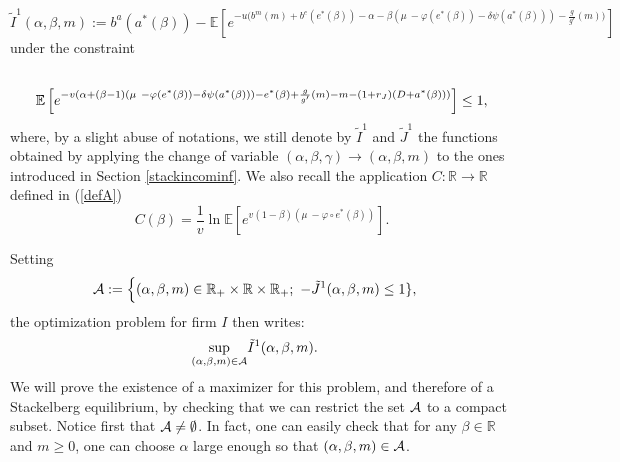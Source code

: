 \documentclass{svjour3}
\begin{document}
$$\tilde I^1(\alpha,\beta,m):=
b^a(a^*(\beta))- \mathbb{E} \left[ e^{-u  \big(b^m(m)+b^e(e^*(\beta))-\alpha-\beta(\mu~-\varphi(e^*(\beta))-\delta\psi(a^*(\beta)))-\frac{g}{g'}(m)\big)  }\right]
$$
under the constraint
\begin{eqnarray*}
&\hspace*{-10cm}-\tilde J^1(\alpha,\beta,m):=\\
&\mathbb{E}  \left[ e^{-v (\alpha+(\beta-1)(\mu~-\varphi(e^*(\beta))-\delta\psi(a^*(\beta)))-e^*(\beta)+\frac{g}{g'}(m)-m -(1+r_J)(D+a^*(\beta) )) }\right] \leq 1,
 \end{eqnarray*}
where, by a slight abuse of notations, we still denote by $\tilde I^1$ and $\tilde J^1$ the functions obtained by applying the change of variable $(\alpha,\beta,\gamma)\to(\alpha,\beta,m)$ to the ones introduced in Section \ref{stackincominf}.
We also recall  the application   $C:\mathbb{R}\to\mathbb{R}$ defined in (\ref{defA})
$$C(\beta)=\frac{1}{v}\ln\mathbb{E}\left[e^{v(1-\beta)(\mu~-\varphi\circ e^*(\beta))}\right].$$

\noindent Setting   
 \begin{eqnarray}
 &{\cal A}:=\Big\{(\alpha,\beta,m)\in \mathbb{R}_+\times\mathbb{R}\times\mathbb{R}_+;~-\tilde J^1(\alpha,\beta,m)\leq 1 \},
 \end{eqnarray}
the optimization problem for firm $I$ then writes:
\begin{eqnarray*}
\sup_{(\alpha,\beta,m)\in{\cal A}}&\tilde I^1(\alpha,\beta,m).
\end{eqnarray*}
We will prove the existence of a maximizer for this problem, and therefore of a Stackelberg equilibrium, by checking that we can restrict the set ${\cal A}$ to a compact subset. Notice first that ${\cal A}\neq\emptyset$. In fact, one can easily check that for any  $\beta\in\mathbb{R}$ and $m\geq 0$, one can choose $\alpha$ large enough so that $(\alpha,\beta,m)\in{\cal A}$.
\\
\end{document}

